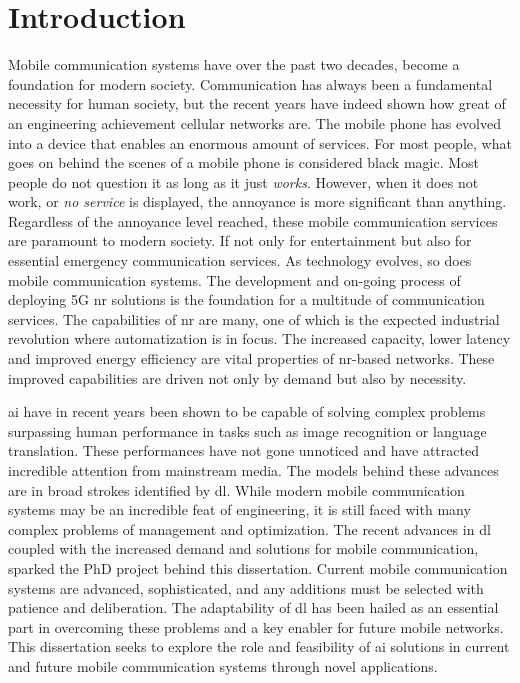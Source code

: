 \chapter*{Introduction}\label{ch:introduction}
Mobile communication systems have over the past two decades, become a foundation for modern society. Communication has always been a fundamental necessity for human society, but the recent years have indeed shown how great of an engineering achievement cellular networks are. The mobile phone has evolved into a device that enables an enormous amount of services. For most people, what goes on behind the scenes of a mobile phone is considered black magic. Most people do not question it as long as it just \emph{works}. However, when it does not work, or \emph{no service} is displayed, the annoyance is more significant than anything. Regardless of the annoyance level reached, these mobile communication services are paramount to modern society. If not only for entertainment but also for essential emergency communication services. As technology evolves, so does mobile communication systems. The development and on-going process of deploying 5G \gls{nr} solutions is the foundation for a multitude of communication services. The capabilities of \gls{nr} are many, one of which is the expected industrial revolution where automatization is in focus. The increased capacity, lower latency and improved energy efficiency are vital properties of \gls{nr}-based networks. These improved capabilities are driven not only by demand but also by necessity. 

\gls{ai} have in recent years been shown to be capable of solving complex problems surpassing human performance in tasks such as image recognition or language translation. These performances have not gone unnoticed and have attracted incredible attention from mainstream media. The models behind these advances are in broad strokes identified by \acrfull{dl}. While modern mobile communication systems may be an incredible feat of engineering, it is still faced with many complex problems of management and optimization. The recent advances in \gls{dl} coupled with the increased demand and solutions for mobile communication, sparked the PhD project behind this dissertation. Current mobile communication systems are advanced, sophisticated, and any additions must be selected with patience and deliberation. The adaptability of \gls{dl} has been hailed as an essential part in overcoming these problems and a key enabler for future mobile networks. This dissertation seeks to explore the role and feasibility of \gls{ai} solutions in current and future mobile communication systems through novel applications. 


